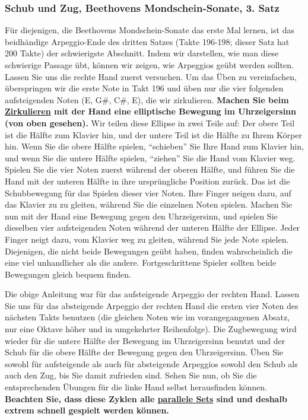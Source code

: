 \label{c1iii5f}
\subsubsection{Schub und Zug, Beethovens Mondschein-Sonate, 3. Satz}
\label{c1iii5SchubZug}

Für diejenigen, die Beethovens Mondschein-Sonate das erste Mal lernen, ist das beidhändige Arpeggio-Ende des dritten Satzes (Takte 196-198; dieser Satz hat 200 Takte) der schwierigste Abschnitt.
Indem wir darstellen, wie man diese schwierige Passage übt, können wir zeigen, wie Arpeggios geübt werden sollten.
Lassen Sie uns die rechte Hand zuerst versuchen.
Um das Üben zu vereinfachen, überspringen wir die erste Note in Takt 196 und üben nur die vier folgenden aufsteigenden Noten (E, G\#, C\#, E), die wir zirkulieren.
\textbf{Machen Sie beim \hyperref[c1iii2]{Zirkulieren} mit der Hand eine elliptische Bewegung im Uhrzeigersinn (von oben gesehen).}
Wir teilen diese Ellipse in zwei Teile auf: Der obere Teil ist die Hälfte zum Klavier hin, und der untere Teil ist die Hälfte zu Ihrem Körper hin.
Wenn Sie die obere Hälfte spielen, \enquote{schieben} Sie Ihre Hand zum Klavier hin, und wenn Sie die untere Hälfte spielen, \enquote{ziehen} Sie die Hand vom Klavier weg.
Spielen Sie die vier Noten zuerst während der oberen Hälfte, und führen Sie die Hand mit der unteren Hälfte in ihre ursprüngliche Position zurück.
Das ist die Schubbewegung für das Spielen dieser vier Noten.
Ihre Finger neigen dazu, auf das Klavier zu zu gleiten, während Sie die einzelnen Noten spielen.
Machen Sie nun mit der Hand eine Bewegung gegen den Uhrzeigersinn, und spielen Sie dieselben vier aufsteigenden Noten während der unteren Hälfte der Ellipse.
Jeder Finger neigt dazu, vom Klavier weg zu gleiten, während Sie jede Note spielen.
Diejenigen, die nicht beide Bewegungen geübt haben, finden wahrscheinlich die eine viel unhandlicher als die andere.
Fortgeschrittene Spieler sollten beide Bewegungen gleich bequem finden.

Die obige Anleitung war für das aufsteigende Arpeggio der rechten Hand.
Lassen Sie uns für das absteigende Arpeggio der rechten Hand die ersten vier Noten des nächsten Takts benutzen (die gleichen Noten wie im vorangegangenen Absatz, nur eine Oktave höher und in umgekehrter Reihenfolge).
Die Zugbewegung wird wieder für die untere Hälfte der Bewegung im Uhrzeigersinn benutzt und der Schub für die obere Hälfte der Bewegung gegen den Uhrzeigersinn.
Üben Sie sowohl für aufsteigende als auch für absteigende Arpeggios sowohl den Schub als auch den Zug, bis Sie damit zufrieden sind.
Sehen Sie nun, ob Sie die entsprechenden Übungen für die linke Hand selbst herausfinden können.
\textbf{Beachten Sie, dass diese Zyklen alle \hyperref[c1ii11]{parallele Sets} sind und deshalb extrem schnell gespielt werden können.}

